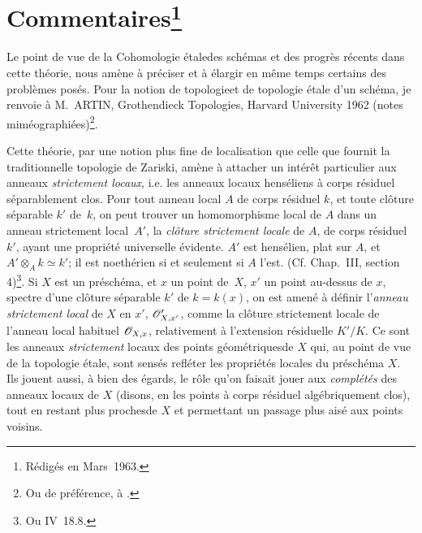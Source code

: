 \section[Commentaires]{Commentaires\footnote{R\'edig\'es en Mars~1963.}} \label{XIII.6}

Le point de vue de la \og Cohomologie \'etale\fg des sch\'emas et des progr\`es r\'ecents dans cette th\'eorie, nous am\`ene \`a pr\'eciser et \`a \'elargir en m\^eme temps certains des probl\`emes pos\'es. Pour la notion de \og topologie\fg et de \og topologie \'etale d'un sch\'ema\fg, je renvoie \`a M.\, ARTIN, Grothendieck Topologies, Harvard University 1962 (notes mim\'eographi\'ees)\footnote{Ou de pr\'ef\'erence, \`a .}.

Cette th\'eorie, par une notion plus fine de localisation que celle que fournit la traditionnelle \og topologie de Zariski\fg, am\`ene \`a attacher un int\'er\^et particulier aux anneaux \emph{strictement locaux}\label{pXIII.6}, i.e. les anneaux locaux hens\'eliens \`a corps r\'esiduel s\'eparablement clos. Pour tout anneau local $A$ de corps r\'esiduel $k$, et toute cl\^{o}ture s\'eparable $k'$ de~$k$, on peut trouver un homomorphisme local de $A$ dans un anneau strictement local~$A'$, la \emph{clôture strictement locale} de $A$, de corps r\'esiduel $k'$, ayant une propri\'et\'e universelle \'evidente. $A'$ est hens\'elien, plat sur $A$, et $A'\otimes_A k\simeq k'$; il est noeth\'erien si et seulement si $A$ l'est. (Cf. \loccit Chap.\, III, section 4)\footnote{Ou \EGA IV~18.8.}. Si $X$ est un pr\'esch\'ema, et $x$ un point de~$X$, $x'$ un point au-dessus de $x$, spectre d'une cl\^{o}ture s\'eparable $k'$ de $k=k(x)$, on est amen\'e \`a d\'efinir l'\emph{anneau strictement local} de $X$ en $x'$, ${\mathscr O}'_{X, x'}$, comme la cl\^{o}ture strictement locale de l'anneau local habituel $\mathscr{O}_{X, x}$, relativement \`a l'extension r\'esiduelle $K'/K$. Ce sont les anneaux \emph{strictement} locaux des points \og g\'eom\'etriques\fg de $X$ qui, au point de vue de la topologie \'etale, sont sens\'es refl\'eter les propri\'et\'es locales du pr\'esch\'ema $X$. Ils jouent aussi, \`a bien des \'egards, le r\^{o}le qu'on faisait jouer aux \emph{complétés} des anneaux locaux de $X$ (disons, en les points \`a corps r\'esiduel alg\'ebriquement clos), tout en restant \og plus proches\fg de $X$ et permettant un passage plus ais\'e aux \og points voisins\fg.

